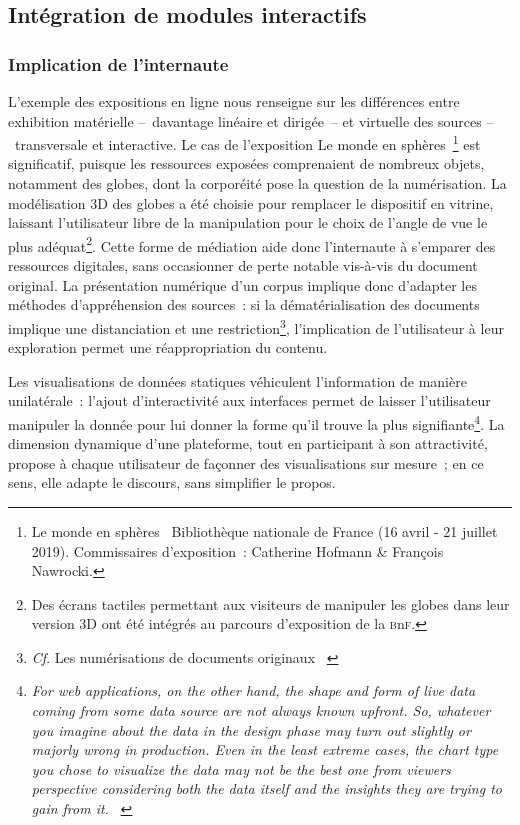\documentclass[a4paper,12pt,twoside]{book}
\newcommand{\eng}{\emph}
\newcommand{\g}[1]{\og#1~\fg}
\begin{document}
		\subsection{Intégration de modules interactifs}
			\subsubsection{Implication de l'internaute}
L'exemple des expositions en ligne nous renseigne sur les différences entre exhibition matérielle –~davantage linéaire et dirigée~– et virtuelle des sources –~transversale et interactive. Le cas de l'exposition \g{Le monde en sphères}\footnote{\g{Le monde en sphères} Bibliothèque nationale de France (16 avril - 21 juillet 2019). Commissaires d'exposition~: Catherine Hofmann \& François Nawrocki.} est significatif, puisque les ressources exposées comprenaient de nombreux objets, notamment des globes, dont la corporéité pose la question de la numérisation. La modélisation 3D des globes a été choisie pour remplacer le dispositif en vitrine, laissant l'utilisateur libre de la manipulation pour le choix de l'angle de vue le plus adéquat\footnote{Des écrans tactiles permettant aux visiteurs de manipuler les globes dans leur version 3D ont été intégrés au parcours d'exposition de la \textsc{b}n\textsc{f}.}. Cette forme de médiation aide donc l'internaute à s'emparer des ressources digitales, sans occasionner de perte notable vis-à-vis du document original. La présentation numérique d'un corpus implique donc d'adapter les méthodes d'appréhension des sources~: si la dématérialisation des documents implique une distanciation et une restriction\footnote{\emph{Cf}. \g{Les numérisations de documents originaux} \cite{bertrandHistorienMedievistePratique2007}}, l'implication de l'utilisateur à leur exploration permet une réappropriation du contenu.

Les visualisations de données statiques véhiculent l'information de manière unilatérale~: l'ajout d'interactivité aux interfaces permet de laisser l'utilisateur manipuler la donnée pour lui donner la forme qu'il trouve la plus signifiante\footnote{\g{\eng{For web applications, on the other hand, the shape and form of live data coming from some data source are not always known upfront. So, whatever you imagine about the data in the design phase may turn out slightly or majorly wrong in production. Even in the least extreme cases, the chart type you chose to visualize the data may not be the best one from viewers perspective considering both the data itself and the insights they are trying to gain from it.}} \cite{LetViewersChange2018}}. La dimension dynamique d'une plateforme, tout en participant à son attractivité, propose à chaque utilisateur de façonner des visualisations sur mesure~; en ce sens, elle adapte le discours, sans simplifier le propos.
\end{document}
